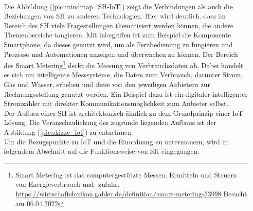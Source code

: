         \\
        Die Abbildung (\ref{pic:mindmap_SH-IoT}) zeigt die Verbindungen als auch die Beziehungen von \acl{SH} 
        zu anderen Technologien. Hier wird deutlich, dass im Bereich des \acl{SH} viele Fragestellungen 
        thematisiert werden können, die andere Themenbereiche tangieren. Mit inbegriffen ist zum Beispiel die 
        Komponente Smartphone, da dieses genutzt wird, um als Fernbedienung zu fungieren und Prozesse und 
        Automationen anzeigen und überwachen zu können. Der Bereich des Smart Metering\footnote{Smart Metering ist das computergestützte Messen, Ermitteln und Steuern von Energieverbrauch und -zufuhr. \url{https://wirtschaftslexikon.gabler.de/definition/smart-metering-53998} Besucht am 06.04.2022} 
        deckt die Messung von Verbrauchsdaten ab. Dabei handelt es sich um intelligente Messsysteme, die 
        Daten zum Verbrauch, darunter Strom, Gas und Wasser, erheben und diese von den jeweiligen Anbietern zur 
        Rechnungsstellung genutzt werden. Ein Beispiel dazu ist ein digitaler intelligenter Stromzähler mit 
        direkter Kommunikationsmöglichkeit zum Anbieter selbst.
        \\
        \linebreak
        Der Aufbau eines \acl{SH} ist architektonisch ähnlich zu dem Grundprinzip einer \acs{IoT}-Lösung. Die 
        Veranschaulichung des zugrunde liegenden Aufbaus ist der Abbildung (\ref{pic:skizze_iot}) zu entnehmen. 
        \\
        Um die Bezugspunkte zu \acs{IoT} und die Einordnung zu untermauern, wird in folgendem Abschnitt auf 
        die Funktionsweise von \acl{SH} eingegangen. 


